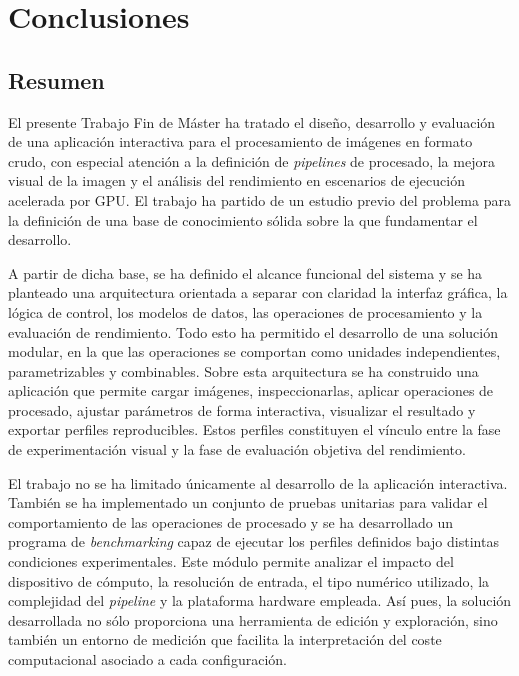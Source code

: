 \section{Conclusiones} \label{sec:conclusiones}

\subsection{Resumen} \label{subsec:conclusiones_resumen}

El presente Trabajo Fin de Máster ha tratado el diseño, desarrollo y evaluación de una
aplicación interactiva para el procesamiento de imágenes en formato crudo, con especial
atención a la definición de \textit{pipelines} de procesado, la mejora visual de la imagen
y el análisis del rendimiento en escenarios de ejecución acelerada por GPU. El trabajo ha
partido de un estudio previo del problema para la definición de una base de conocimiento
sólida sobre la que fundamentar el desarrollo.

A partir de dicha base, se ha definido el alcance funcional del sistema y se ha planteado
una arquitectura orientada a separar con claridad la interfaz gráfica, la lógica de control,
los modelos de datos, las operaciones de procesamiento y la evaluación de rendimiento.
Todo esto ha permitido el desarrollo de una solución modular, en la que las operaciones se
comportan como unidades independientes, parametrizables y combinables. Sobre esta arquitectura
se ha construido una aplicación que permite cargar imágenes, inspeccionarlas, aplicar
operaciones de procesado, ajustar parámetros de forma interactiva, visualizar el resultado
y exportar perfiles reproducibles. Estos perfiles constituyen el vínculo entre la fase de
experimentación visual y la fase de evaluación objetiva del rendimiento.

El trabajo no se ha limitado únicamente al desarrollo de la aplicación interactiva. También se ha
implementado un conjunto de pruebas unitarias para validar el comportamiento de las operaciones
de procesado y se ha desarrollado un programa de \textit{benchmarking} capaz de ejecutar los
perfiles definidos bajo distintas condiciones experimentales. Este módulo permite analizar
el impacto del dispositivo de cómputo, la resolución de entrada, el tipo numérico utilizado, la
complejidad del \textit{pipeline} y la plataforma hardware empleada. Así pues, la solución
desarrollada no sólo proporciona una herramienta de edición y exploración, sino también un
entorno de medición que facilita la interpretación del coste computacional asociado a cada
configuración.

